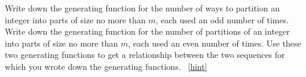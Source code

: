 \documentclass{book}
\begin{document}
\setcounter{project}{326}
\addtocounter{project}{-1}
\begin{activity}[]\label{activity-319}
\hypertarget{p-1662}{}%
Write down the generating function for the number of ways to partition an integer into parts of size no more than \(m\), each used an odd number of times. Write down the generating function for the number of partitions of an integer into parts of size no more than \(m\), each used an even number of times. Use these two generating functions to get a relationship between the two sequences for which you wrote down the generating functions.%
~\hfill{\tiny\hyperlink{a-326}{[hint]}\hypertarget{q-326}{}}\end{activity}
\end{document}
